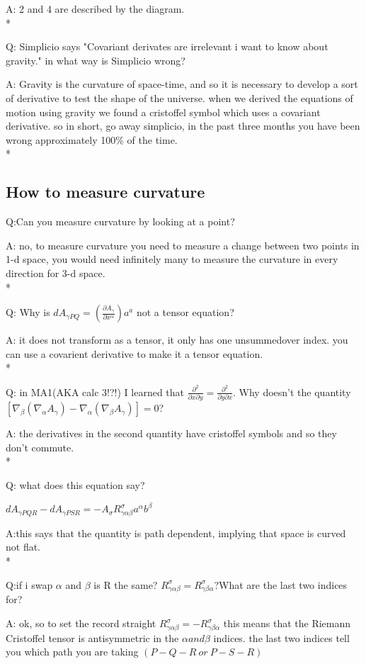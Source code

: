 \documentclass{article}
\begin{document}
A: 2 and 4 are described by the diagram.
\\*

Q: Simplicio says "Covariant derivates are irrelevant i want to know about gravity." in what way is Simplicio wrong?

A: Gravity is the curvature of space-time, and so it is necessary to develop a sort of derivative to test the shape of the universe. when we derived the equations of motion using gravity we found a cristoffel symbol which uses a covariant derivative. so in short, go away simplicio, in the past three months you have been wrong approximately 100\% of the time. 
\\*

\subsection{How to measure curvature}

\hspace{0.5cm}Q:Can you measure curvature by looking at a point?

A: no, to measure curvature you need to measure a change between two points in 1-d space, you would need infinitely many to measure the curvature in every direction for 3-d space.
\\*

Q: Why is $dA_{\gamma PQ}=(\frac{\partial A_{\gamma}}{\partial x^{\alpha}})a^{a}$ not a tensor equation?

A: it does not transform as a tensor, it only has one unsummedover index. you can use a covarient derivative to make it a tensor equation.
\\*

Q: in MA1(AKA calc 3!?!) I learned that $\frac{\partial^{2}}{\partial x\partial y}=\frac{\partial^{2}}{\partial y\partial x}$. Why doesn't the quantity $[\nabla_{\beta}(\nabla_{\alpha}A_{\gamma})-\nabla_{\alpha}(\nabla_{\beta}A_{\gamma})]=0$?

A: the derivatives in the second quantity have cristoffel symbols and so they don't commute.
\\*

Q: what does this equation say? 

$dA_{\gamma PQR}-dA_{\gamma PSR}=-A_{\sigma}R^{\sigma}_{\gamma\alpha\beta}a^{\alpha}b^{\beta}$

A:this says that the quantity is path dependent, implying that space is curved not flat.
\\*

Q:if i swap $\alpha$ and $\beta$ is R the same? $R^{\sigma}_{\gamma\alpha\beta}=R^{\sigma}_{\gamma\beta\alpha}$?What are the last two indices for?

A: ok, so to set the record straight $R^{\sigma}_{\gamma\alpha\beta}= -R^{\sigma}_{\gamma\beta\alpha}$ this means that the Riemann Cristoffel tensor is antisymmetric in the $\alpha and \beta$ indices. the last two indices tell you which path you are taking $(P-Q-R\ or\ P-S-R)$
\end{document}
